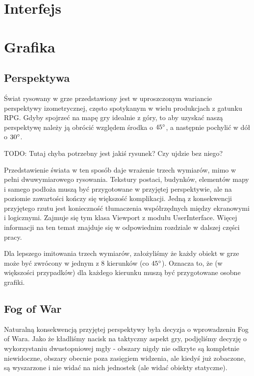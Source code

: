 \documentclass[licencjacka]{pracamgr}
\begin{document}
  \section{Interfejs}

  \section{Grafika}
    \subsection{Perspektywa}
    Świat rysowany w grze przedstawiony jest w uproszczonym wariancie perspektywy izometrycznej, często spotykanym w
    wielu produkcjach z gatunku RPG. Gdyby spojrzeć na mapę gry idealnie z góry, to aby uzyskać naszą perspektywę należy
    ją obrócić względem środka o $45\degree$, a następnie pochylić w dół o $30\degree$.

    TODO: Tutaj chyba potrzebny jest jakiś rysunek? Czy ujdzie bez niego?

    Przedstawienie świata w ten sposób daje wrażenie trzech wymiarów, mimo w pełni dwuwymiarowego rysowania. Tekstury
    postaci, budynków, elementów mapy i samego podłoża muszą być przygotowane w przyjętej perspektywie, ale na poziomie
    zawartości kończy się większość komplikacji. Jedną z konsekwencji przyjętego rzutu jest konieczność tłumaczenia
    współrzędnych między ekranowymi i logicznymi. Zajmuje się tym klasa Viewport z modułu UserInterface. Więcej
    informacji na ten temat znajduje się w odpowiednim rozdziale w dalszej części pracy.

    Dla lepszego imitowania trzech wymiarów, założyliśmy że każdy obiekt w grze może być zwrócony w jednym z 8 kierunków
    (co $45\degree$). Oznacza to, że (w większości przypadków) dla każdego kierunku muszą być przygotowane osobne
    grafiki.

    \subsection{Fog of War}
    Naturalną konsekwencją przyjętej perspektywy była decyzja o wprowadzeniu Fog of Wara. Jako że kładliśmy nacisk na
    taktyczny aspekt gry, podjęliśmy decyzję o wykorzystaniu dwustopniowej mgły - obszary nigdy nie odkryte są
    kompletnie niewidoczne, obszary obecnie poza zasięgiem widzenia, ale kiedyś już zobaczone, są wyszarzone i nie widać
    na nich jednostek (ale widać obiekty statyczne).
\end{document}

